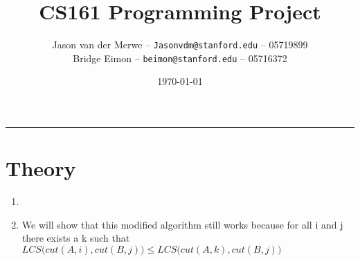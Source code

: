 \documentclass[12pt]{article}
\title{CS161 Programming Project}
\author{Jason van der Merwe -- \texttt{Jasonvdm@stanford.edu} -- 05719899\\
Bridge Eimon -- \texttt{beimon@stanford.edu} -- 05716372}
\date{\today}
\begin{document}
\maketitle

\vspace{-0.3in}
\rule{\linewidth}{0.4pt}


\section*{Theory}
\begin{enumerate}
    \item 
    \item We will show that this modified algorithm still works because for all i and j there exists a k such that $LCS\big(cut(A,i), cut(B,j)\big) \le LCS\big(cut(A,k), cut(B,j)\big)$ 
    

\end{enumerate}
\end{document}
